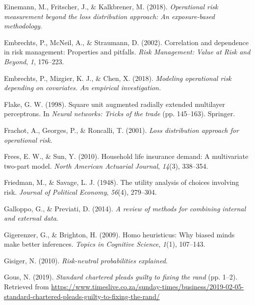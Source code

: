 \documentclass{DissertateUSU}
\begin{document}
\leavevmode\hypertarget{ref-einemann2018operational}{}%
Einemann, M., Fritscher, J., \& Kalkbrener, M. (2018). \emph{Operational
risk measurement beyond the loss distribution approach: An
exposure-based methodology}.

\leavevmode\hypertarget{ref-embrechts2002correlation}{}%
Embrechts, P., McNeil, A., \& Straumann, D. (2002). Correlation and
dependence in risk management: Properties and pitfalls. \emph{Risk
Management: Value at Risk and Beyond}, \emph{1}, 176--223.

\leavevmode\hypertarget{ref-embrechts2018modeling}{}%
Embrechts, P., Mizgier, K. J., \& Chen, X. (2018). \emph{Modeling
operational risk depending on covariates. An empirical investigation.}

\leavevmode\hypertarget{ref-flake1998square}{}%
Flake, G. W. (1998). Square unit augmented radially extended multilayer
perceptrons. In \emph{Neural networks: Tricks of the trade} (pp.
145--163). Springer.

\leavevmode\hypertarget{ref-frachot2001loss}{}%
Frachot, A., Georges, P., \& Roncalli, T. (2001). \emph{Loss
distribution approach for operational risk}.

\leavevmode\hypertarget{ref-frees2010household}{}%
Frees, E. W., \& Sun, Y. (2010). Household life insurance demand: A
multivariate two-part model. \emph{North American Actuarial Journal},
\emph{14}(3), 338--354.

\leavevmode\hypertarget{ref-friedman1948utility}{}%
Friedman, M., \& Savage, L. J. (1948). The utility analysis of choices
involving risk. \emph{Journal of Political Economy}, \emph{56}(4),
279--304.

\leavevmode\hypertarget{ref-galloppo2014review}{}%
Galloppo, G., \& Previati, D. (2014). \emph{A review of methods for
combining internal and external data}.

\leavevmode\hypertarget{ref-gigerenzer2009homo}{}%
Gigerenzer, G., \& Brighton, H. (2009). Homo heuristicus: Why biased
minds make better inferences. \emph{Topics in Cognitive Science},
\emph{1}(1), 107--143.

\leavevmode\hypertarget{ref-gisiger2010risk}{}%
Gisiger, N. (2010). \emph{Risk-neutral probabilities explained}.

\leavevmode\hypertarget{ref-suntimes2019}{}%
Gous, N. (2019). \emph{Standard chartered pleads guilty to fixing the
rand} (pp. 1--2). Retrieved from
\url{https://www.timeslive.co.za/sunday-times/business/2019-02-05-standard-chartered-pleads-guilty-to-fixing-the-rand/}
\end{document}
